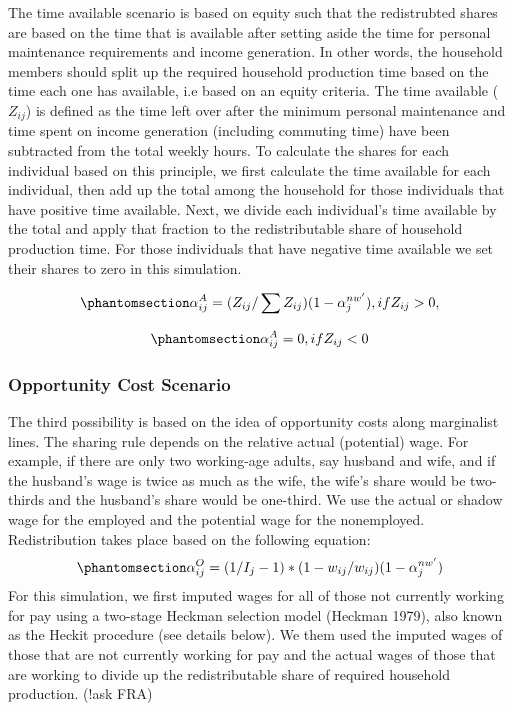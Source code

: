 \documentclass[
  11pt,
]{article}
\begin{document}
The time available scenario is based on equity such that the
redistrubted shares are based on the time that is available after
setting aside the time for personal maintenance requirements and income
generation. In other words, the household members should split up the
required household production time based on the time each one has
available, i.e based on an equity criteria. The time available
(\(Z_{ij}\)) is defined as the time left over after the minimum personal
maintenance and time spent on income generation (including commuting
time) have been subtracted from the total weekly hours. To calculate the
shares for each individual based on this principle, we first calculate
the time available for each individual, then add up the total among the
household for those individuals that have positive time available. Next,
we divide each individual's time available by the total and apply that
fraction to the redistributable share of household production time. For
those individuals that have negative time available we set their shares
to zero in this simulation.

\begin{equation}\phantomsection\label{eq-r2}{\alpha_{ij}^A= (Z_{ij}/ \sum Z_{ij}) (1-\alpha_{j}^{nw'}), if  Z_{ij}>0, 
}\end{equation}

\begin{equation}\phantomsection\label{eq-r3}{\alpha_{ij}^A =0, if Z_{ij}<0
}\end{equation}

\subsubsection{Opportunity Cost
Scenario}\label{opportunity-cost-scenario}

The third possibility is based on the idea of opportunity costs along
marginalist lines. The sharing rule depends on the relative actual
(potential) wage. For example, if there are only two working-age adults,
say husband and wife, and if the husband's wage is twice as much as the
wife, the wife's share would be two-thirds and the husband's share would
be one-third. We use the actual or shadow wage for the employed and the
potential wage for the nonemployed. Redistribution takes place based on
the following equation:
\begin{equation}\phantomsection\label{eq-r3}{\alpha_{ij}^O= (1/{I_j-1})*(1-w_{ij}/w_{ij} ) (1-\alpha_{j}^{nw'})
}\end{equation} For this simulation, we first imputed wages for all of
those not currently working for pay using a two-stage Heckman selection
model (Heckman 1979), also known as the Heckit procedure (see details
below). We them used the imputed wages of those that are not currently
working for pay and the actual wages of those that are working to divide
up the redistributable share of required household production. (!ask
FRA)
\end{document}
